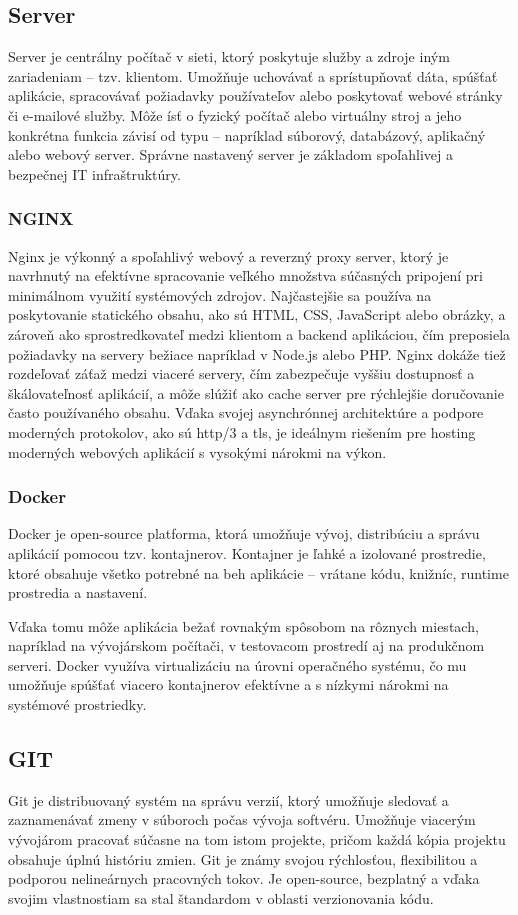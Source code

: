 \subsection{Server}
Server je centrálny počítač v sieti, ktorý poskytuje služby a zdroje iným zariadeniam – tzv. klientom. 
Umožňuje uchovávať a sprístupňovať dáta, spúšťať aplikácie, spracovávať požiadavky používateľov alebo poskytovať webové stránky či e-mailové služby.
 Môže ísť o fyzický počítač alebo virtuálny stroj a jeho konkrétna funkcia závisí od typu – napríklad súborový, databázový, aplikačný alebo webový server. 
 Správne nastavený server je základom spoľahlivej a bezpečnej IT infraštruktúry.\cite{server}
\subsubsection{NGINX}
Nginx\cite{nginx} je výkonný a spoľahlivý webový a reverzný proxy server, ktorý je navrhnutý na efektívne spracovanie veľkého množstva súčasných pripojení pri minimálnom využití systémových zdrojov. 
Najčastejšie sa používa na poskytovanie statického obsahu, ako sú HTML, CSS, JavaScript alebo obrázky, a zároveň ako sprostredkovateľ medzi klientom a backend aplikáciou, čím preposiela požiadavky na servery bežiace napríklad v Node.js alebo PHP. 
Nginx dokáže tiež rozdeľovať záťaž medzi viaceré servery, čím zabezpečuje vyššiu dostupnosť a škálovateľnosť aplikácií, a môže slúžiť ako cache server pre rýchlejšie doručovanie často používaného obsahu.
 Vďaka svojej asynchrónnej architektúre a podpore moderných protokolov, ako sú \acrshort{http}/3 a \acrshort{tls}, je ideálnym riešením pre hosting moderných webových aplikácií s vysokými nárokmi na výkon.
\subsubsection{Docker}
Docker je open-source platforma, ktorá umožňuje vývoj, distribúciu a správu aplikácií pomocou tzv. kontajnerov. 
Kontajner je ľahké a izolované prostredie, ktoré obsahuje všetko potrebné na beh aplikácie – vrátane kódu, knižníc, runtime prostredia a nastavení.

Vďaka tomu môže aplikácia bežať rovnakým spôsobom na rôznych miestach, napríklad na vývojárskom počítači, v testovacom prostredí aj na produkčnom serveri. 
Docker využíva virtualizáciu na úrovni operačného systému, čo mu umožňuje spúšťať viacero kontajnerov efektívne a s nízkymi nárokmi na systémové prostriedky.\cite{docker}
\subsection{GIT}
Git je distribuovaný systém na správu verzií, ktorý umožňuje sledovať a zaznamenávať zmeny v súboroch počas vývoja softvéru.
 Umožňuje viacerým vývojárom pracovať súčasne na tom istom projekte, pričom každá kópia projektu obsahuje úplnú históriu zmien. 
 Git je známy svojou rýchlosťou, flexibilitou a podporou nelineárnych pracovných tokov. 
Je open-source, bezplatný a vďaka svojim vlastnostiam sa stal štandardom v oblasti verzionovania kódu.\cite{git}

